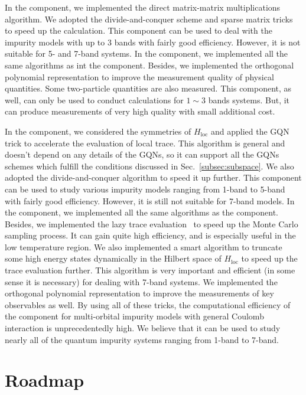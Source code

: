 In the {\begonia} component, we implemented the direct matrix-matrix multiplications algorithm. We adopted the divide-and-conquer scheme and sparse matrix tricks to speed up the calculation. This component can be used to deal with the impurity models with up to $3$ bands with fairly good efficiency. However, it is not suitable for 5- and 7-band systems. In the {\lavender} component, we implemented all the same algorithms as int the {\begonia} component. Besides, we implemented the orthogonal polynomial representation to improve the measurement quality of physical quantities. Some two-particle quantities are also measured. This component, as well, can only be used to conduct calculations for $1 \sim 3$ bands systems. But, it can produce measurements of very high quality with small additional cost.

In the {\pansy} component, we considered the symmetries of $H_{\text{loc}}$ and applied the GQN trick to accelerate the evaluation of local trace. This algorithm is general and doesn't depend on any details of the GQNs, so it can support all the GQNs schemes which fulfill the conditions discussed in Sec.~\ref{subsec:subspace}. We also adopted the divide-and-conquer algorithm to speed it up further. This component can be used to study various impurity models ranging from 1-band to 5-band with fairly good efficiency. However, it is still not suitable for 7-band models. In the {\manjushaka} component, we implemented all the same algorithms as the {\pansy} component. Besides, we implemented the lazy trace evaluation~\cite{arXiv:1403.7214} to speed up the Monte Carlo sampling process. It can gain quite high efficiency, and is especially useful in the low temperature region. We also implemented a smart algorithm to truncate some high energy states dynamically in the Hilbert space of $H_{\text{loc}}$ to speed up the trace evaluation further. This algorithm is very important and efficient (in some sense it is necessary) for dealing with 7-band systems. We implemented the orthogonal polynomial representation to improve the measurements of key observables as well. By using all of these tricks, the computational efficiency of the {\manjushaka} component for multi-orbital impurity models with general Coulomb interaction is unprecedentedly high. We believe that it can be used to study nearly all of the quantum impurity systems ranging from 1-band to 7-band.

\section{Roadmap}


